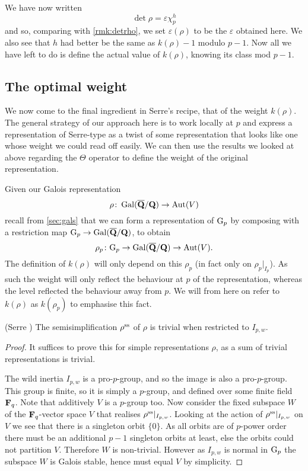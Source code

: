 \documentclass[a4paper,12pt]{article}
\begin{document}
We have now written
\[
\det\rho = \varepsilon \chi_p^h
\]
and so, comparing with \cref{rmk:detrho}, we set $\varepsilon(\rho)$ to be the $\varepsilon$ obtained here.
We also see that $h$ had better be the same as $k(\rho)-1$ modulo $p-1$.
Now all we have left to do is define the actual value of $k(\rho)$, knowing its class mod $p-1$.



\subsection{The optimal weight}
We now come to the final ingredient in Serre's recipe, that of the weight $k(\rho)$.
The general strategy of our approach here is to work locally at $p$ and express a representation of Serre-type as a twist of some representation that looks like one whose weight we could read off easily.
We can then use the results we looked at above regarding the $\Theta$ operator to define the weight of the original representation.

Given our Galois representation
\[
\rho \colon \operatorname{Gal}(\overline{\mathbf{Q}}/\mathbf{Q}) \to \operatorname{Aut}(V)
\]
recall from \cref{sec:gals} that we can form a representation of $\mathrm{G}_p$ by composing with a restriction map $\mathrm{G}_p \to\operatorname{Gal}(\overline{\mathbf{Q}}/\mathbf{Q})$, to obtain
\[
\rho_p\colon \mathrm{G}_p \to \operatorname{Gal}(\overline{\mathbf{Q}}/\mathbf{Q}) \to \operatorname{Aut}(V).
\]
The definition of $k(\rho)$ will only depend on this $\rho_p$ (in fact only on $\rho_p|_{I_p}$).
As such the weight will only reflect the behaviour at $p$ of the representation, whereas the level reflected the behaviour away from $p$.
We will from here on refer to $k(\rho)$ as $k(\rho_p)$ to emphasise this fact.

\begin{prop}(Serre \cite[prop. 4]{Serre72})\label{prop:wildtriv}
The semisimplification $\rho^\text{ss}$ of $\rho$ is trivial when restricted to $I_{p,w}$.
\end{prop}
\begin{proof}
It suffices to prove this for simple representations $\rho$, as a sum of trivial representations is trivial.

The wild inertia $I_{p,w}$ is a pro-$p$-group, and so the image is also a pro-$p$-group.
This group is finite, so it is simply a $p$-group, and defined over some finite field $\mathbf{F}_q$.
Note that additively $V$ is a $p$-group too.
Now consider the fixed subspace $W$ of the $\mathbf{F}_q$-vector space $V$ that realises $\rho^\text{ss}|_{I_{p,w}}$.
Looking at the action of $\rho^\text{ss}|_{I_{p,w}}$ on $V$ we see that there is a singleton orbit $\{0\}$.
As all orbits are of $p$-power order there must be an additional $p-1$ singleton orbits at least, else the orbits could not partition $V$.
Therefore $W$ is non-trivial.
However as $I_{p,w}$ is normal in $\mathrm{G}_p$ the subspace $W$ is Galois stable, hence must equal $V$ by simplicity.
\end{proof}
\end{document}
